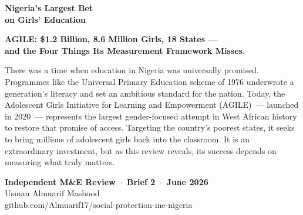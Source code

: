 \documentclass[11pt,landscape,letterpaper]{article}
\begin{document}
\thispagestyle{fancy}

\vspace*{0.4cm}

{\color{navy}\fontsize{46}{54}\selectfont\bfseries
Nigeria's Largest Bet\\[-0.05em] on Girls' Education}

\vspace{0.5cm}

{\color{gold}\fontsize{20}{26}\selectfont\bfseries
AGILE: \$1.2 Billion, 8.6 Million Girls, 18 States ---\\[-0.05em]
and the Four Things Its Measurement Framework Misses.}

\vspace{0.9cm}

\begin{minipage}{0.82\textwidth}
  \color{navy}\fontsize{12.5}{19}\selectfont
  There was a time when education in Nigeria was universally promised.
  Programmes like the Universal Primary Education scheme of 1976 underwrote
  a generation's literacy and set an ambitious standard for the nation.
  Today, the Adolescent Girls Initiative for Learning and Empowerment
  (AGILE)~--- launched in 2020~--- represents the largest gender-focused
  attempt in West African history to restore that promise of access.
  Targeting the country's poorest states, it seeks to bring millions of
  adolescent girls back into the classroom. It is an extraordinary
  investment, but as this review reveals, its success depends on
  measuring what truly matters.
\end{minipage}

\vfill

\begin{minipage}{0.6\textwidth}
  \color{midgrey}\fontsize{10}{14}\selectfont
  \textbf{\color{navy}Independent M\&E Review \,$\cdot$\, Brief 2 \,$\cdot$\, June 2026}\\
  Usman Almuarif Mashood\\
  github.com/Almuarif17/social-protection-me-nigeria
\end{minipage}

\newpage
\thispagestyle{fancy}
\end{document}
